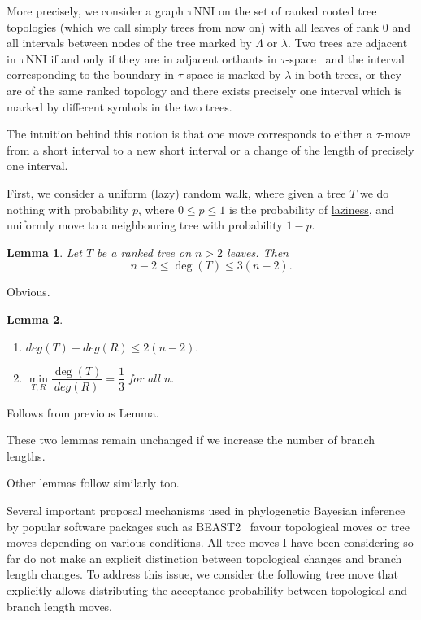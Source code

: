 \documentclass{amsart}
\newtheorem{lemma}{Lemma}
\newcommand{\tN}{\mathrm{\tau NNI}}
\begin{document}
More precisely, we consider a graph $\tN$ on the set of ranked rooted tree 
topologies (which we call simply trees from now on) with all leaves of rank 
$0$ and all intervals between nodes of the tree marked by $\Lambda$ or
$\lambda$. Two trees are adjacent in $\tN$ if and only if they are in 
adjacent orthants in $\tau$-space~\cite{Gavryushkin2014-bw} and the interval corresponding 
to the boundary in $\tau$-space is marked by $\lambda$ in both trees, 
or they are of the same ranked topology and there 
exists precisely one interval which is marked by different symbols in 
the two trees. 

The intuition behind this notion is that one move corresponds to either 
a $\tau$-move from a short interval to a new short interval or a change 
of the length of precisely one interval. 

First, we consider a uniform (lazy) random walk, where given a tree $T$ 
we do nothing with probability $p$, where $0\leq p\leq 1$ is the probability of 
\href{https://academichelp.net/wp-content/uploads/2014/01/laziness.jpg}{laziness},
and uniformly move to a neighbouring tree with probability $1-p$. 

\begin{lemma}
Let $T$ be a ranked tree on $n>2$ leaves. Then \[n-2\leq \deg(T)\leq3(n-2).\] 
\end{lemma}

\proof
Obvious.
\endproof

\begin{lemma}
\begin{enumerate}[(1)]
\item $deg(T)-deg(R) \leq 2(n-2).$
\item $\min\limits_{T,R}\dfrac{\deg(T)}{deg(R)} = \dfrac13$ for all $n.$
\end{enumerate}
\end{lemma}

\proof
Follows from previous Lemma. 
\endproof

These two lemmas remain unchanged if we increase the number of branch lengths. 

Other lemmas follow similarly too. 

Several important proposal mechanisms used in phylogenetic Bayesian inference by 
popular software packages such as BEAST2~\cite{beast2} favour topological moves
or tree moves depending on various conditions. All tree moves I have been 
considering so far do not make an explicit distinction between topological 
changes and branch length changes. To address this issue, we consider the
following tree move that explicitly allows distributing the acceptance 
probability between topological and branch length moves. 
\end{document}
